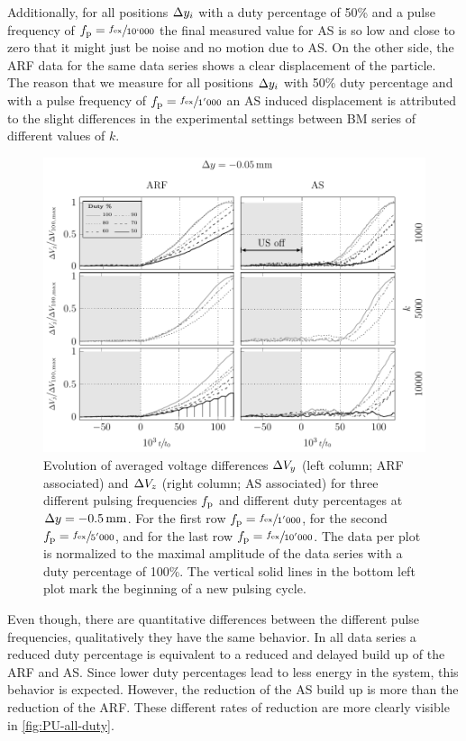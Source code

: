 Additionally, for all positions $\Delta y_{i}$ with a duty percentage of 50\% and a 
pulse frequency of $f_{\mathrm{p}}=\sfrac{f_{\mathrm{ex}}}{10`000}$ the final measured value for AS 
is so low and close to zero that it might just be noise and no motion due to 
AS. On the other side, the ARF data for the same data series shows a clear 
displacement of the particle. The reason that we measure for all positions 
$\Delta y_{i}$ with 50\% duty percentage and with a pulse frequency of 
$f_{\mathrm{p}}=\sfrac{f_{\mathrm{ex}}}{1'000}$ an AS induced displacement is attributed to the 
slight differences in the experimental settings between BM series of different 
values of $k$.

\begin{figure}[tbp]
  \centering
  \includegraphics[]{Plots/cache/duty-m05.pdf}
  \caption{Evolution of averaged voltage differences $\Delta V_{y}$ (left column; 
    ARF associated) and $\Delta V_{z}$ (right column; AS associated) for three 
    different pulsing frequencies $f_{\mathrm{p}}$ and different duty percentages at 
    $\Dy=\SI{-0.5}{\mm}$. For the first row $f_{\mathrm{p}}=\sfrac{f_{\mathrm{ex}}}{1'000}$, for the 
    second $f_{\mathrm{p}}=\sfrac{f_{\mathrm{ex}}}{5'000}$, and for the last row 
    $f_{\mathrm{p}}=\sfrac{f_{\mathrm{ex}}}{10'000}$. The data per plot is normalized to the maximal 
    amplitude of the data series with a duty percentage of 100\%. The vertical 
    solid lines in the bottom left plot mark the beginning of a new pulsing 
    cycle. 
}\label{fig:PU-duty-m05}
\end{figure}

Even though, there are quantitative differences between the different pulse 
frequencies, qualitatively they have the same behavior. In all data series a 
reduced duty percentage is equivalent to a reduced and delayed build up of the 
ARF and AS. Since lower duty percentages lead to less energy in the system, 
this behavior is expected. However, the reduction of the AS build up is more 
than the reduction of the ARF. These different rates of reduction are more 
clearly visible in \cref{fig:PU-all-duty}.

